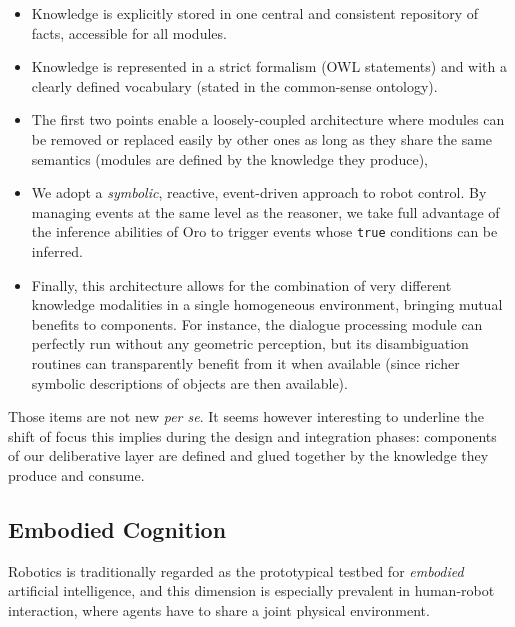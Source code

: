 \documentclass[preprint,5p]{elsarticle}
\begin{document}
\begin{itemize}
    
    \item{Knowledge is explicitly stored in one central and consistent
    repository of facts, accessible for all modules.} 

    \item{Knowledge is represented in a strict formalism (OWL statements) and
    with a clearly defined vocabulary (stated in the common-sense ontology).}

    \item{The first two points enable a loosely-coupled architecture where
    modules can be removed or replaced easily by other ones as long as
    they share the same semantics (modules are defined by the knowledge they
    produce),} 

    \item{We adopt a \emph{symbolic}, reactive, event-driven approach to robot control.
    By managing events at the same level as the reasoner, we take full
    advantage of the inference abilities of {\sc Oro} to trigger events whose
    \texttt{true} conditions can be inferred.} 

    \item{Finally, this architecture allows for the combination of very
    different knowledge modalities in a single homogeneous environment,
    bringing mutual benefits to components. For instance, the dialogue
    processing module can perfectly run without any geometric
    perception, but its disambiguation routines can transparently
    benefit from it when available (since richer symbolic descriptions of
    objects are then available).}

\end{itemize}

Those items are not new \emph{per se}. It seems however interesting to
underline the shift of focus this implies during the design and integration
phases: components of our deliberative layer are defined and glued together by
the knowledge they produce and consume.


\subsection{Embodied Cognition}

Robotics is traditionally regarded as the prototypical testbed for \emph{embodied}
artificial intelligence, and this dimension is especially prevalent in
human-robot interaction, where agents have to share a joint physical
environment.
\end{document}
